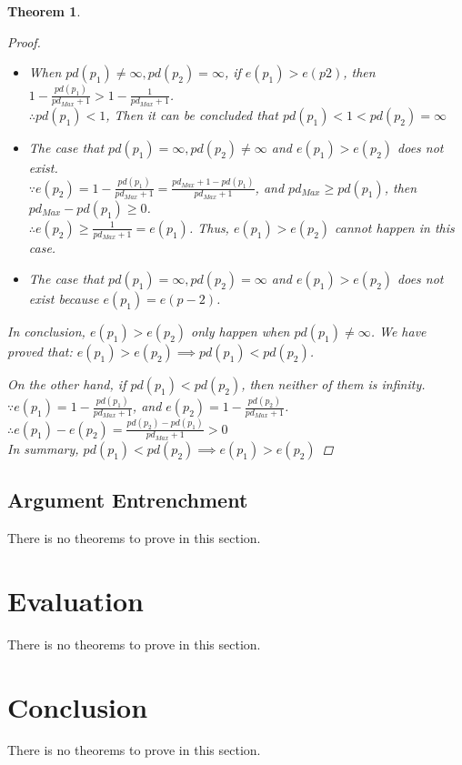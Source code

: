 \documentclass[11pt,letterpaper]{article}
\newtheorem{theorem}{Theorem}[section]
\begin{document}
\begin{theorem}
\begin{enumerate}
\begin{proof}
\begin{itemize}
 \item When $pd(p_1)\neq \infty, pd(p_2)= \infty$,  if $e(p_1)>e(p2)$, then $1- \frac{pd(p_1)}{pd_{Max}+1}>1- \frac{1}{pd_{Max}+1}$.\\
 $\therefore pd(p_1) < 1$, Then it can be concluded that $pd(p_1) < 1<pd(p_2)= \infty$
 \item The case that $pd(p_1)= \infty, pd(p_2)\neq \infty$ and $e(p_1)>e(p_2)$ does not exist.\\
 $\because e(p_2)= 1- \frac{pd(p_1)}{pd_{Max}+1}=\frac{pd_{Max}+1 - pd(p_1)}{pd_{Max}+1}$, and $pd_{Max} \geq pd(p_1)$, then $pd_{Max}- pd(p_1)\geq 0$.\\
 $\therefore  e(p_2)\geq \frac{1}{pd_{Max}+1}=e(p_1)$. Thus, $e(p_1)>e(p_2)$ cannot happen in this case. 
 
 \item The case that $pd(p_1)= \infty, pd(p_2)= \infty$ and $e(p_1)>e(p_2)$ does not exist because $e(p_1)=e(p-2)$.
\end{itemize}
In conclusion, $e(p_1)>e(p_2)$ only happen when $pd(p_1)\neq\infty$. We have proved that:  $e(p_1)>e(p_2) \implies pd(p_1)<pd(p_2)$.



On the other hand, if $pd(p_1)<pd(p_2)$, then neither of them is infinity. \newline
$\because e(p_1) = 1- \frac{pd(p_1)}{pd_{Max}+1}$, and $e(p_2) = 1- \frac{pd(p_2)}{pd_{Max}+1}$.\\
$\therefore e(p_1)-e(p_2) = \frac{pd(p_2)-pd(p_1)}{pd_{Max}+1}>0$\\
In summary, $pd(p_1)<pd(p_2) \implies e(p_1)>e(p_2) $
 
\end{proof}
\end{enumerate}
\end{theorem}




\subsection{Argument Entrenchment}
\label{sec:ee:args}

\noindent 
There is no theorems to prove in this section.

\section{Evaluation}
\label{sec:eva}

\noindent 
There is no theorems to prove in this section.


\section{Conclusion}
\label{conclusion}

\noindent 
There is no theorems to prove in this section.
\end{document}
